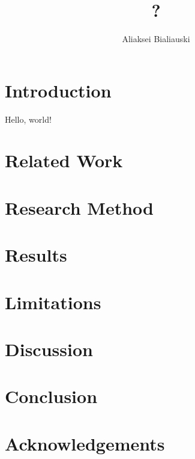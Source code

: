 \documentclass[sigplan,nonacm,review]{acmart}
\title{?}
\author{Aliaksei Bialiauski}
\affiliation{
    \institution{?}
    \city{Minsk}
    \country{Belarus}
}
\begin{document}
    \maketitle


    \section{Introduction}\label{sec:introduction}
    Hello, world!


    \section{Related Work}\label{sec:related}


    \section{Research Method}\label{sec:method}


    \section{Results}\label{sec:results}


    \section{Limitations}\label{sec:limitations}


    \section{Discussion}\label{sec:discussion}


    \section{Conclusion}\label{sec:conclusion}


    \section{Acknowledgements}\label{sec:acks}

    
    \cite{testCitation}
    
\end{document}
